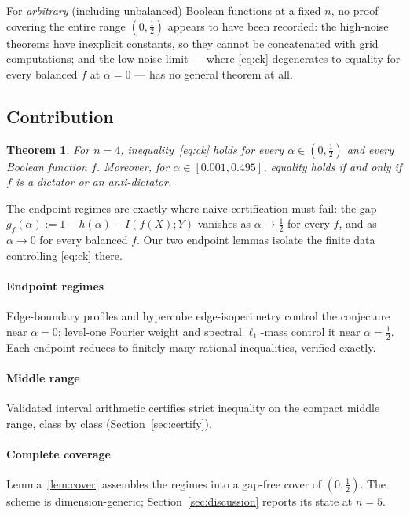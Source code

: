 \documentclass[12pt,draftclsnofoot,onecolumn,journal]{IEEEtran}
\newtheorem{theorem}{Theorem}
\begin{document}
For \emph{arbitrary} (including unbalanced) Boolean functions at a fixed $n$,
no proof covering the entire range $(0,\tfrac12)$ appears to have been
recorded: the high-noise theorems have inexplicit constants, so they cannot
be concatenated with grid computations; and the low-noise limit --- where
\eqref{eq:ck} degenerates to equality for every balanced $f$ at $\alpha=0$
--- has no general theorem at all.

\subsection{Contribution}

\begin{theorem}\label{thm:main}
For $n=4$, inequality~\eqref{eq:ck} holds for every $\alpha\in(0,\tfrac12)$ and
every Boolean function $f$. Moreover, for $\alpha\in[0.001,0.495]$, equality
holds if and only if $f$ is a dictator or an anti-dictator.
\end{theorem}

The endpoint regimes are exactly where naive certification must fail: the gap
$g_f(\alpha):=1-h(\alpha)-I(f(X);Y)$ vanishes as $\alpha\to\tfrac12$ for every
$f$, and as $\alpha\to0$ for every balanced $f$. Our two endpoint lemmas
isolate the finite data controlling \eqref{eq:ck} there.

\paragraph{Endpoint regimes} Edge-boundary profiles and hypercube
edge-isoperimetry control the conjecture near $\alpha=0$; level-one Fourier
weight and spectral $\ell_1$-mass control it near $\alpha=\tfrac12$. Each
endpoint reduces to finitely many rational inequalities, verified exactly.

\paragraph{Middle range} Validated interval arithmetic certifies strict
inequality on the compact middle range, class by class
(Section~\ref{sec:certify}).

\paragraph{Complete coverage} Lemma~\ref{lem:cover} assembles the regimes into
a gap-free cover of $(0,\tfrac12)$. The scheme is dimension-generic;
Section~\ref{sec:discussion} reports its state at $n=5$.
\end{document}
